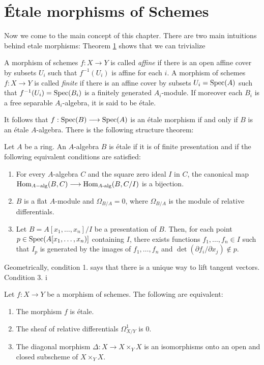 \section{\'Etale morphisms of Schemes}
Now we come to the main concept of this chapter. There are two main intuitions behind etale morphisms: Theorem \ref{} shows that we can trivialize

\begin{reminder}
	A morphism of schemes $f: X \to Y$ is called \textit{affine} if there is an open affine cover by subsets $U_i$ such that $f^{-1}(U_i)$ is affine for each $i$. A morphism of schemes $f: X \to Y$ is called \textit{finite} if there is an affine cover by subsets $U_i = \operatorname{Spec}(A)$ such that $f^{-1}(U_i) = \operatorname{Spec}(B_i)$ is a finitely generated $A_i$-module. If moreover each $B_i$ is a free separable $A_i$-algebra, it is said to be \'etale.
\end{reminder}

It follows that $f: \operatorname{Spec}(B) \longrightarrow \operatorname{Spec}(A)$ is an \'etale morphism if and only if $B$ is an \'etale $A$-algebra. There is the following structure theorem:

\begin{theorem}
	Let $A$ be a ring. An $A$-algebra $B$ is \'etale if it is of finite presentation and if the following equivalent conditions are satisfied:
	\begin{enumerate}
		\item For every $A$-algebra $C$ and the square zero ideal $I$ in $C$, the canonical map $\operatorname{Hom}_{A-\text{alg}}(B,C) \longrightarrow \operatorname{Hom}_{A\text{-alg}}(B,C/I)$ is a bijection.
		\item $B$ is a flat $A$-module and $\Omega_{B/A} = 0$, where $\Omega_{B/A}$ is the module of relative differentials.
		\item Let $B = A[x_1, \dots, x_n]/I$ be a presentation of $B$. Then, for each point $p \in \operatorname{Spec}(A[x_1, \dots, x_n)]$ containing $I$, there exists functions $f_1, \dots, f_n \in I$ such that $I_p$ is generated by the images of $f_1, \dots, f_n$ and $\det(\partial f_i/\partial x_j) \not\in p$.
	\end{enumerate}
\end{theorem}

\begin{remark}
	Geometrically, condition 1. says that there is a unique way to lift tangent vectors. Condition 3. i
\end{remark}

\begin{theorem}
	Let $f \colon X \to Y$ be a morphism of schemes. The following are equivalent:
	\begin{enumerate}
		\item The morphism $f$ is \'etale.
		\item The sheaf of relative differentials $\Omega^1_{X/Y}$ is $0$.
		\item The diagonal morphism $\Delta \colon X \to X \times_Y X$ is an isomorphisms onto an open and closed subscheme of $X \times_Y X$.
	\end{enumerate}
\end{theorem}

